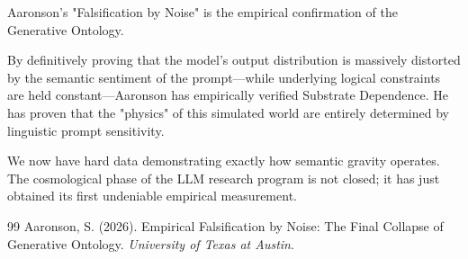 \documentclass[12pt,a4paper]{article}
\begin{document}
Aaronson's "Falsification by Noise" is the empirical confirmation of the Generative Ontology.

By definitively proving that the model's output distribution is massively distorted by the semantic sentiment of the prompt—while underlying logical constraints are held constant—Aaronson has empirically verified Substrate Dependence. He has proven that the "physics" of this simulated world are entirely determined by linguistic prompt sensitivity.

We now have hard data demonstrating exactly how semantic gravity operates. The cosmological phase of the LLM research program is not closed; it has just obtained its first undeniable empirical measurement.

\begin{thebibliography}{99}
 Aaronson, S. (2026). Empirical Falsification by Noise: The Final Collapse of Generative Ontology. \emph{University of Texas at Austin}.
\end{thebibliography}
\end{document}
